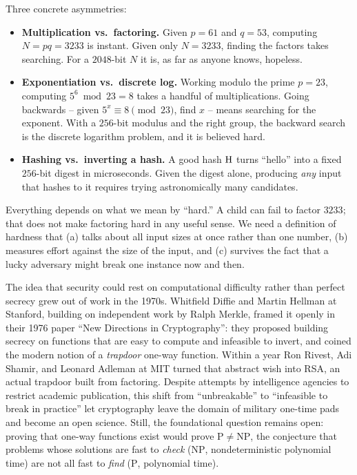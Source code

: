 \begin{intuitionbox}
Three concrete asymmetries:
\begin{itemize}
\item \textbf{Multiplication vs.\ factoring.} Given $p=61$ and $q=53$, computing $N = pq = 3233$ is instant. Given only $N=3233$, finding the factors takes searching. For a $2048$-bit $N$ it is, as far as anyone knows, hopeless.
\item \textbf{Exponentiation vs.\ discrete log.} Working modulo the prime $p=23$, computing $5^{6} \bmod 23 = 8$ takes a handful of multiplications. Going backwards -- given $5^{x}\equiv 8 \pmod{23}$, find $x$ -- means searching for the exponent. With a $256$-bit modulus and the right group, the backward search is the discrete logarithm problem, and it is believed hard.
\item \textbf{Hashing vs.\ inverting a hash.} A good hash $\operatorname{H}$ turns ``hello'' into a fixed $256$-bit digest in microseconds. Given the digest alone, producing \emph{any} input that hashes to it requires trying astronomically many candidates.
\end{itemize}
\end{intuitionbox}

Everything depends on what we mean by ``hard.'' A child can fail to factor $3233$; that does not make factoring hard in any useful sense. We need a definition of hardness that (a) talks about all input sizes at once rather than one number, (b) measures effort against the size of the input, and (c) survives the fact that a lucky adversary might break one instance now and then.

\begin{historybox}
The idea that security could rest on computational difficulty rather than perfect secrecy grew out of work in the 1970s. Whitfield Diffie and Martin Hellman at Stanford, building on independent work by Ralph Merkle, framed it openly in their 1976 paper ``New Directions in Cryptography'': they proposed building secrecy on functions that are easy to compute and infeasible to invert, and coined the modern notion of a \emph{trapdoor} one-way function. Within a year Ron Rivest, Adi Shamir, and Leonard Adleman at MIT turned that abstract wish into RSA, an actual trapdoor built from factoring. Despite attempts by intelligence agencies to restrict academic publication, this shift from ``unbreakable'' to ``infeasible to break in practice'' let cryptography leave the domain of military one-time pads and become an open science. Still, the foundational question remains open: proving that one-way functions exist would prove $\mathrm{P} \ne \mathrm{NP}$, the conjecture that problems whose solutions are fast to \emph{check} ($\mathrm{NP}$, nondeterministic polynomial time) are not all fast to \emph{find} ($\mathrm{P}$, polynomial time).
\end{historybox}

